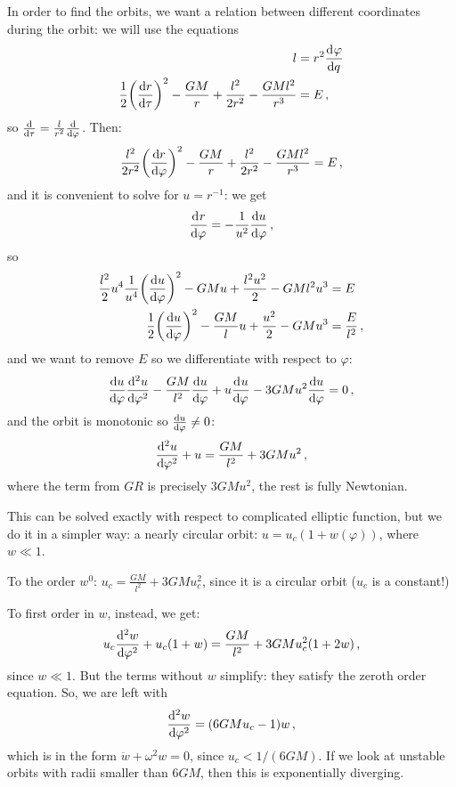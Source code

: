 \documentclass[main.tex]{subfiles}
\begin{document}
In order to find the orbits, we want a relation between different coordinates during the orbit: we will use the equations 
%
\begin{subequations}
\begin{align}
  l &= r^2 \dv[]{\varphi }{q}  \\
  \frac{1}{2}\qty(\dv{r}{\tau })^2 - \frac{GM}{r} + \frac{l^2}{2r^2} - \frac{GMl^2}{r^3} &= E 
\,,
\end{align}
\end{subequations}
%
so \(\dv{}{\tau } = \frac{l}{r^2} \dv{}{\varphi }\). Then: 
%
\begin{align}
  \frac{l^2}{2 r^2} \qty(\dv{r}{\varphi })^2 - \frac{GM}{r} + \frac{l^2}{2r^2} - \frac{GMl^2}{r^3} = E
\,,
\end{align}
%
and it is convenient to solve for \(u = r^{-1}\): we get 
%
\begin{align}
  \dv[]{r}{\varphi } = - \frac{1}{u^2} \dv{u }{\varphi }
\,,
\end{align}
%
so 
%
\begin{subequations}
\begin{align}
  \frac{l^2}{2} u^{4} \frac{1}{ u^{4 }} \qty(\dv{u}{\varphi })^2 - GMu + \frac{l^2u^2}{2} - GMl^2u^3 &= E \\
  \frac{1}{2}\qty(\dv{u}{\varphi })^2 - \frac{GM}{l} u + \frac{u^2}{2} - GMu^3 &= \frac{E}{l^2}
\,,
\end{align}
\end{subequations}
%
and we want to remove \(E\) so we differentiate with respect to \(\varphi \): 
%
\begin{align}
  \dv{u }{\varphi } \dv[2]{u}{\varphi } - \frac{GM}{l^2} \dv{u}{\varphi } + u \dv[]{u}{\varphi } - 3GM u^2 \dv{u}{\varphi } = 0
\,,
\end{align}
%
and the orbit is monotonic so \(\dv{u}{\varphi } \neq 0\): 
%
\begin{align}
  \dv[2]{u}{\varphi } + u = \frac{GM}{l^2} + 3GMu^2
\,,
\end{align}
%
where the term from \(GR\) is precisely \(3GMu^2\), the rest is fully Newtonian.

This can be solved exactly with respect to complicated elliptic function, but we do it in a simpler way: a nearly circular orbit: \(u = u_c (1+w(\varphi ))\), where \(w \ll 1\).

To the order \(w^{0}\): \(u_c = \frac{GM}{l^2} + 3GM u_c^{2}\), since it is a circular orbit (\(u_c\) is a constant!)

To first order in \(w\), instead, we get: 
%
\begin{align}
  u_c \dv[2]{w}{\varphi } + u_c(1+w) = \frac{GM}{l^2} + 3GMu_c^2 (1+2w)
\,,
\end{align}
%
since \(w \ll 1\). But the terms without \(w\) simplify: they satisfy the zeroth order equation. So, we are left with 
%
\begin{align}
  \dv[2]{w}{\varphi }  = (6GMu_c-1) w
\,,
\end{align}
%
which is in the form \(\ddot{w} + \omega^2 w =0\), since \(u_c < 1/(6GM)\). If we look at unstable orbits with radii smaller than \(6GM\), then this is exponentially diverging.
\end{document}
